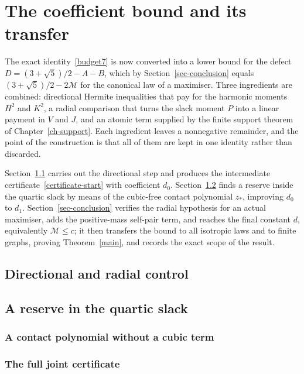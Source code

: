\chapter{The coefficient bound and its transfer}\label{ch-bound}

The exact identity~\eqref{budget7} is now converted into a lower bound for
the defect $D=(3+\sqrt5)/2-A-B$, which by Section~\ref{sec-conclusion} equals
$(3+\sqrt5)/2-2\mathcal M$ for the canonical law of a maximiser. Three
ingredients are combined: directional Hermite inequalities that pay for the
harmonic moments $H^2$ and $K^2$, a radial comparison that turns the slack
moment $P$ into a linear payment in $V$ and $J$, and an atomic term supplied
by the finite support theorem of Chapter~\ref{ch-support}. Each ingredient
leaves a nonnegative remainder, and the point of the construction is that all
of them are kept in one identity rather than discarded.

Section~\ref{sec-directional} carries out the directional step and produces
the intermediate certificate~\eqref{certificate-start} with coefficient $d_0$.
Section~\ref{sec-reserve} finds a reserve inside the quartic slack by means of
the cubic-free contact polynomial $z_*$, improving $d_0$ to $d_1$.
Section~\ref{sec-conclusion} verifies the radial hypothesis for an actual
maximiser, adds the positive-mass self-pair term, and reaches the final
constant $d$, equivalently $\mathcal M\le c$; it then transfers the bound to
all isotropic laws and to finite graphs, proving Theorem~\ref{main}, and
records the exact scope of the result.

\section{Directional and radial control}\label{sec-directional}


\section{A reserve in the quartic slack}\label{sec-reserve}


\subsection{A contact polynomial without a cubic term}


\subsection{The full joint certificate}


